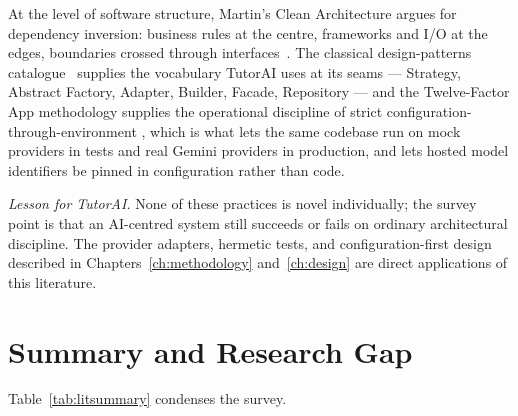 At the level of software structure, Martin's Clean Architecture argues for
dependency inversion: business rules at the centre, frameworks and I/O at the
edges, boundaries crossed through interfaces~\cite{martin2017clean}. The
classical design-patterns catalogue~\cite{gamma1994} supplies the vocabulary
TutorAI uses at its seams --- Strategy, Abstract Factory, Adapter, Builder,
Facade, Repository --- and the Twelve-Factor App methodology supplies the
operational discipline of strict configuration-through-environment
\cite{twelvefactor}, which is what lets the same codebase run on mock
providers in tests and real Gemini providers in production, and lets hosted
model identifiers be pinned in configuration rather than code.

\emph{Lesson for TutorAI.} None of these practices is novel individually;
the survey point is that an AI-centred system still succeeds or fails on
ordinary architectural discipline. The provider adapters, hermetic tests, and
configuration-first design described in Chapters~\ref{ch:methodology}
and~\ref{ch:design} are direct applications of this literature.

\section{Summary and Research Gap}

Table~\ref{tab:litsummary} condenses the survey.

